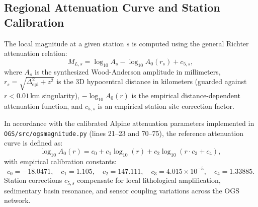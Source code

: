 \subsection{Regional Attenuation Curve and Station Calibration}
The local magnitude at a given station $s$ is computed using the general Richter attenuation relation:
\begin{equation}
  M_{L, s} = \log_{10} A_s - \log_{10} A_0(r_s) + c_{5, s},
\end{equation}
where $A_s$ is the synthesized Wood-Anderson amplitude in millimeters, $r_s = \sqrt{\Delta_{\mathrm{epi}}^2 + z^2}$ is the 3D hypocentral distance in kilometers (guarded against $r < 0.01\,\mathrm{km}$ singularity), $-\log_{10} A_0(r)$ is the empirical distance-dependent attenuation function, and $c_{5, s}$ is an empirical station site correction factor.

In accordance with the calibrated Alpine attenuation parameters implemented in \texttt{OGS/src/ogsmagnitude.py} (lines 21--23 and 70--75), the reference attenuation curve is defined as:
\begin{equation}
  \log_{10} A_0(r) = c_0 + c_1 \log_{10}(r) + c_2 \log_{10}(r \cdot c_3 + c_4),
\end{equation}
with empirical calibration constants:
\begin{equation}
  c_0 = -18.0471, \quad c_1 = 1.105, \quad c_2 = 147.111, \quad c_3 = 4.015 \times 10^{-5}, \quad c_4 = 1.33885.
\end{equation}
Station corrections $c_{5, s}$ compensate for local lithological amplification, sedimentary basin resonance, and sensor coupling variations across the OGS network.

